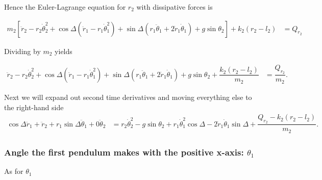 \documentclass[12pt,a4paper,portrait]{article}
\begin{document}
\begin{landscape}
Hence the Euler-Lagrange equation for $r_2$ with dissipative forces is

\begin{align*}
	m_2\left[\ddot{r}_2 - r_2\dot{\theta}_2^2 + \cos{\Delta}(\ddot{r}_1 - r_1\dot{\theta}_1^2)+\sin{\Delta}(r_1\ddot{\theta}_1 + 2\dot{r}_1\dot{\theta}_1) + g\sin{\theta_2}\right] + k_2(r_2-l_2) &= Q_{r_2}
\end{align*}

Dividing by $m_2$ yields

\begin{align*}
	\ddot{r}_2 - r_2\dot{\theta}_2^2 + \cos{\Delta}(\ddot{r}_1 - r_1\dot{\theta}_1^2)+\sin{\Delta}(r_1\ddot{\theta}_1 + 2\dot{r}_1\dot{\theta}_1) + g\sin{\theta_2} + \dfrac{k_2(r_2-l_2)}{m_2} &= \dfrac{Q_{r_2}}{m_2}.
\end{align*}

Next we will expand out second time derivatives and moving everything else to the right-hand side
\begin{align*}
	\cos{\Delta}\ddot{r}_1 + \ddot{r}_2 + r_1\sin{\Delta}\ddot{\theta}_1 + 0\ddot{\theta}_2 &= r_2\dot{\theta}_2^2  - g\sin{\theta_2} + r_1\dot{\theta}_1^2\cos{\Delta} - 2\dot{r}_1\dot{\theta}_1\sin{\Delta} + \dfrac{Q_{r_2}-k_2(r_2-l_2)}{m_2}.
\end{align*}

\subsubsection{Angle the first pendulum makes with the positive x-axis: $\theta_1$}
As for $\theta_1$


\end{landscape}
\end{document}
